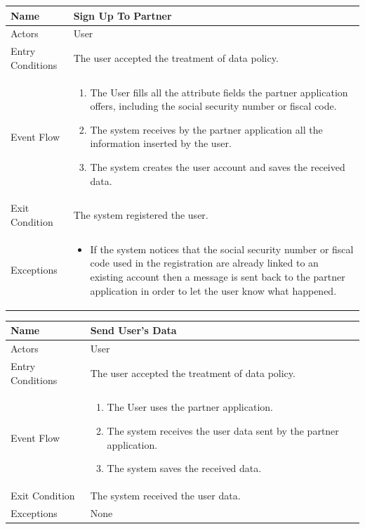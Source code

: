 \begin{enumerate}
\FloatBarrier
\begin{table}[h]
\begin{tabular}{|l|p{}|}
\hline
Name             & Sign Up To Partner\\ \hline
Actors           & User  \\ \hline
Entry Conditions & The user accepted the treatment of data policy.  \\ \hline
Event Flow       & \begin{enumerate}
            \item The User fills all the attribute fields the partner application offers, including the social security number or fiscal code.
            \item The system receives by the partner application all the information inserted by the user.
            \item The system creates the user account and saves the received data.
        \end{enumerate}\\ \hline
Exit Condition   & The system registered the user.\\ \hline
Exceptions       & \begin{itemize}
\item If the system notices that the social security number or fiscal code used in the registration are already linked to an existing account then a message is sent back to the partner application in order to let the user know what happened.
\end{itemize}\\ \hline
\end{tabular}
\end{table}
\FloatBarrier


\FloatBarrier
\begin{table}[h]
\begin{tabular}{|l|p{}|}
\hline
Name             & Send User's Data\\ \hline
Actors           & User  \\ \hline
Entry Conditions & The user accepted the treatment of data policy.  \\ \hline
Event Flow       & \begin{enumerate}
            \item The User uses the partner application.
            \item The system receives the user data sent by the partner application.
            \item The system saves the received data.
        \end{enumerate}\\ \hline
Exit Condition   & The system received the user data.\\ \hline
Exceptions       & None \\ \hline
\end{tabular}
\end{table}
\FloatBarrier


\end{enumerate}

